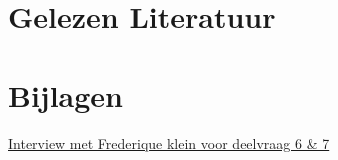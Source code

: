 \documentclass{article}
\begin{document}
\section{Gelezen Literatuur}
\citet{i2cmemfault}
\citet{bmp280adafruit}
\citet{computernerdgithub}
\citet{dpvtechyoutube}
\citet{makerpro}
\citet{hattori2008architecture}
\citet{i2cinfo}
\citet{indrekyoutube}
\citet{ov7670instructables}
\citet{lupyuenyoutube}
\citet{matanbrightarduino}
\citet{wiki:megapixel}
\citet{mt9m001arducam}
\citet{mt9m001utronics}
\citet{mrarduinoarduino}
\citet{ov7670voti}
\citet{ov7670implementationgithub}
\citet{ov7670opencircuit}
\citet{latexoverleaf}
\citet{ov7670interfaceegprojects}
\citet{i2crobotelectronics}
\citet{song2019development}
\citet{configregistersstackexchange}
\citet{surtrtechyoutube}
\citet{vela2018face}
\citet{connectov7670instructables}


\section{Bijlagen}
\href{https://docs.google.com/document/d/1SsX8LF4RwbH1YNNYjNoLCvhxlJQ-Cs8OT3DVWehyQDE/edit?usp=sharing}{Interview met Frederique klein voor deelvraag 6 \& 7}


\end{document}
